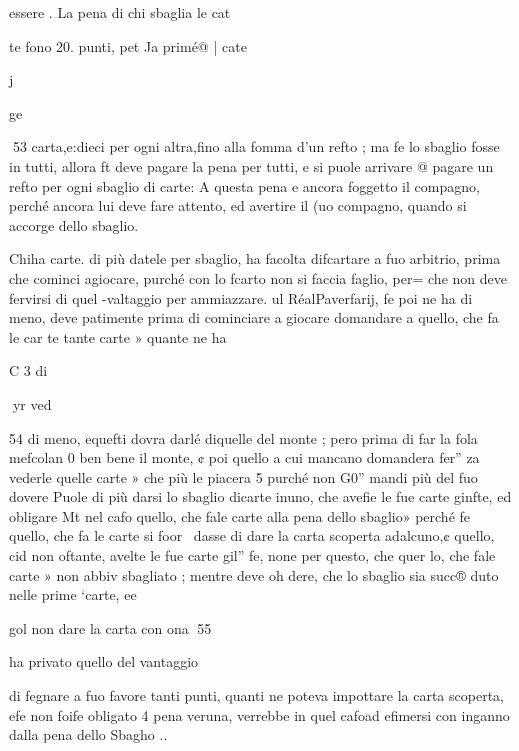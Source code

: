 \documentclass[12pt,a6paper]{article}
\begin{document}
essere .
La pena di chi sbaglia le cat

te fono 20. punti, pet Ja primé@
| cate

 

 

j

ge

 
53
carta,e:dieci per ogni altra,fino
alla fomma d’un refto ; ma fe lo
sbaglio fosse in tutti, allora ft
deve pagare la pena per tutti,
e si puole arrivare @ pagare un
refto per ogni sbaglio di carte:
A questa pena e ancora foggetto
il compagno, perché ancora lui
deve fare attento, ed avertire
il (uo compagno, quando si accorge dello sbaglio.

Chiha carte. di più datele per
sbaglio, ha facolta difcartare
a fuo arbitrio, prima che cominci agiocare, purché con lo
fcarto non si faccia faglio, per=
che non deve fervirsi di quel
-valtaggio per ammiazzare. ul
RéalPaverfarij, fe poi ne ha di
meno, deve patimente prima
di cominciare a giocare domandare a quello, che fa le car
te tante carte » quante ne ha

C 3 di

 

 

 

 
yr ved

 

 

 

 

 

54
di meno, equefti dovra darlé
diquelle del monte ; pero prima di far la fola mefcolan 0
ben bene il monte, ¢ poi quello
a cui mancano domandera fer”
za vederle quelle carte » che
più le piacera 5 purché non G0”
mandi più del fuo dovere Puole di più darsi lo sbaglio
dicarte inuno, che avefie le
fue carte ginfte, ed obligare Mt
nel cafo quello, che fale carte
alla pena dello sbaglio» perché
fe quello, che fa le carte si foor~
dasse di dare la carta scoperta
adalcuno,¢ quello, cid non
oftante, avelte le fue carte gil”
fe, none per questo, che quer
lo, che fale carte » non abbiv
sbagliato ; mentre deve oh
dere, che lo sbaglio sia succ®
duto nelle prime ‘carte, ee

gol non dare la carta con
ona
55

ha privato quello del vantaggio

di fegnare a fuo favore tanti
punti, quanti ne poteva impottare la carta scoperta, efe non
foife obligato 4 pena veruna,
verrebbe in quel cafoad efimersi con inganno dalla pena dello
Sbagho ..
\end{document}
